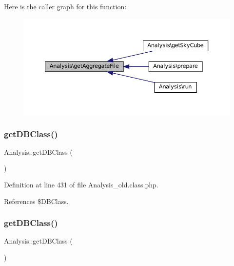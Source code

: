 Here is the caller graph for this function\+:\nopagebreak
\begin{figure}[H]
\begin{center}
\leavevmode
\includegraphics[width=350pt]{class_analysis_a3a36df8e0acaa0d84d66483f395a913c_icgraph}
\end{center}
\end{figure}
\mbox{\label{class_analysis_ac2da7aa0c6cb2b44acf3f4551ffc1b69}} 
\subsubsection{\texorpdfstring{get\+D\+B\+Class()}{getDBClass()}\hspace{0.1cm}{\footnotesize\ttfamily [1/2]}}
{\footnotesize\ttfamily Analysis\+::get\+D\+B\+Class (\begin{DoxyParamCaption}{ }\end{DoxyParamCaption})}



Definition at line 431 of file Analysis\+\_\+old.\+class.\+php.



References \$\+D\+B\+Class.

\mbox{\label{class_analysis_ac2da7aa0c6cb2b44acf3f4551ffc1b69}} 
\subsubsection{\texorpdfstring{get\+D\+B\+Class()}{getDBClass()}\hspace{0.1cm}{\footnotesize\ttfamily [2/2]}}
{\footnotesize\ttfamily Analysis\+::get\+D\+B\+Class (\begin{DoxyParamCaption}{ }\end{DoxyParamCaption})}

